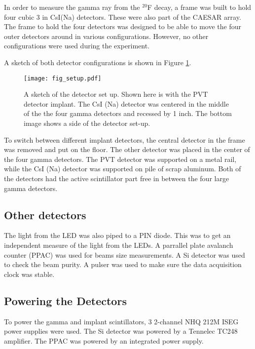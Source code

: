 In order to measure the gamma ray from the $^{20}$F decay, a frame was built to hold four cubic 3 in CsI(Na) detectors.  
These were also part of the CAESAR array.
The frame to hold the four detectors was designed to be able to move the four outer detectors around in various configurations.
However, no other configurations were used during the experiment. 

A sketch of both detector configurations is shown in Figure \ref{fig:detsketch}.

\begin{figure}
	\texttt{[image: fig\_setup.pdf]}
	\caption{A sketch of the detector set up. 
	Shown here is with the PVT detector implant.
	The CsI (Na) detector was centered in the middle of the the four gamma detectors and recessed by 1 inch.
	The bottom image shows a side of the detector set-up.}
	\label{fig:detsketch}
\end{figure}

To switch between different implant detectors, the central detector in the frame was removed and put on the floor.
The other detector was placed in the center of the four gamma detectors.
The PVT detector was supported on a metal rail, while the CsI (Na) detector was supported on pile of scrap aluminum.
Both of the detectors had the active scintillator part free in between the four large gamma detectors. 

\subsection{Other detectors}

The light from the LED was also piped to a PIN diode.
This was to get an independent measure of the light from the LEDs.
A parrallel plate avalanch counter (PPAC) was used for beams size measurements.
A Si detector was used to check the beam purity.
A pulser was used to make sure the data acquisition clock was stable.

\subsection{Powering the Detectors}

To power the gamma and implant scintillators, 3 2-channel NHQ 212M ISEG power supplies were used.
The Si detector was powered by a Tennelec TC248 amplifier.
The PPAC was powered by an integrated power supply.

